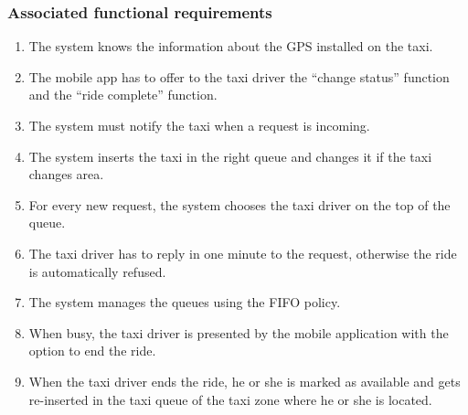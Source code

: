 \subsubsection{Associated functional requirements}
\begin{enumerate}
\item The system knows the information about the GPS installed on the taxi.
\item The mobile app has to offer to the taxi driver the ``change status'' function and the ``ride complete'' function.
\item The system must notify the taxi when a request is incoming.
\item The system inserts the taxi in the right queue and changes it if the taxi changes area.
\item For every new request, the system chooses the taxi driver on the top of the queue.
\item The taxi driver has to reply in one minute to the request, otherwise the ride is automatically refused.
\item The system manages the queues using the FIFO policy.
\item When busy, the taxi driver is presented by the mobile application with the option to end the ride.
\item When the taxi driver ends the ride, he or she is marked as available and gets re-inserted in the taxi queue of the taxi zone where he or she is located.
\end{enumerate}
